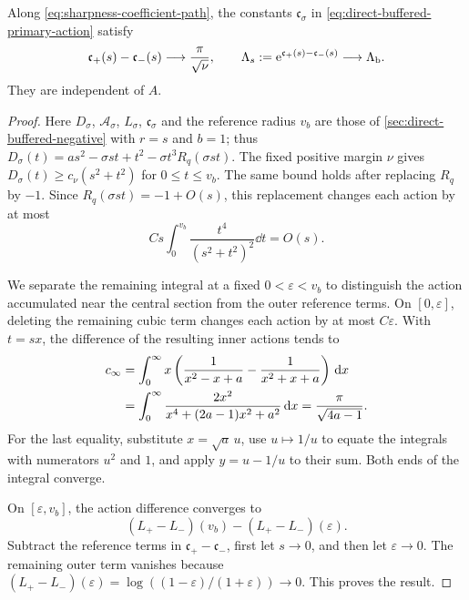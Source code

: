 \begin{samepage}
\begin{lemma}
\label{lem:buffered-action-limit}
Along \eqref{eq:sharpness-coefficient-path}, the constants
\(\mathfrak c_\sigma\) in \eqref{eq:direct-buffered-primary-action} satisfy
\[
 \mathfrak c_+(s)-\mathfrak c_-(s)\longrightarrow\frac{\pi}{\sqrt\nu},
 \qquad
 \Lambda_s:=\mathrm e^{\mathfrak c_+(s)-\mathfrak c_-(s)}\longrightarrow\Lambda_{\rm b}.
\]
They are independent of \(A\).
\end{lemma}
\end{samepage}

\begin{proof}
Here \(D_\sigma\), \(\mathcal A_\sigma\), \(L_\sigma\), \(\mathfrak c_\sigma\) and the
reference radius \(v_b\) are those of \cref{sec:direct-buffered-negative}
with \(r=s\) and \(b=1\); thus
\(D_\sigma(t)=as^2-\sigma st+t^2-\sigma t^3R_q(\sigma st)\).
The fixed positive margin \(\nu\) gives
\(D_\sigma(t)\ge c_\nu(s^2+t^2)\) for \(0\le t\le v_b\).
The same bound holds after replacing \(R_q\) by \(-1\).
Since \(R_q(\sigma st)=-1+O(s)\), this replacement changes
each action by at most
\[
 Cs\int_0^{v_b}\frac{t^4}{(s^2+t^2)^2}\dd t=O(s).
\]

We separate the remaining integral at a fixed
\(0<\varepsilon<v_b\) to distinguish the action accumulated near
the central section from the outer reference terms. On
\([0,\varepsilon]\), deleting the
remaining cubic term changes each action by at most \(C\varepsilon\).
With \(t=sx\), the difference of the resulting inner actions tends to
\begin{align}
\label{eq:sharpness-action-integral}
 c_\infty
 &=\int_0^\infty x
   \left(\frac1{x^2-x+a}-\frac1{x^2+x+a}\right)\,\mathrm d x \notag\\
 &=\int_0^\infty
       \frac{2x^2}{x^4+(2a-1)x^2+a^2}\,\mathrm d x
   =\frac{\pi}{\sqrt{4a-1}}.
\end{align}
For the last equality, substitute \(x=\sqrt a\,u\), use
\(u\mapsto1/u\) to equate the integrals with numerators \(u^2\)
and \(1\), and apply \(y=u-1/u\) to their sum.
Both ends of the integral converge.

On \([\varepsilon,v_b]\), the action difference converges to
\[
 (L_+-L_-)(v_b)-(L_+-L_-)(\varepsilon).
\]
Subtract the reference terms in \(\mathfrak c_+-\mathfrak c_-\),
first let \(s\to0\), and then let \(\varepsilon\to0\).
The remaining outer term vanishes because
\((L_+-L_-)(\varepsilon)=\log((1-\varepsilon)/(1+\varepsilon))\to0\).
This proves the result.
\end{proof}

